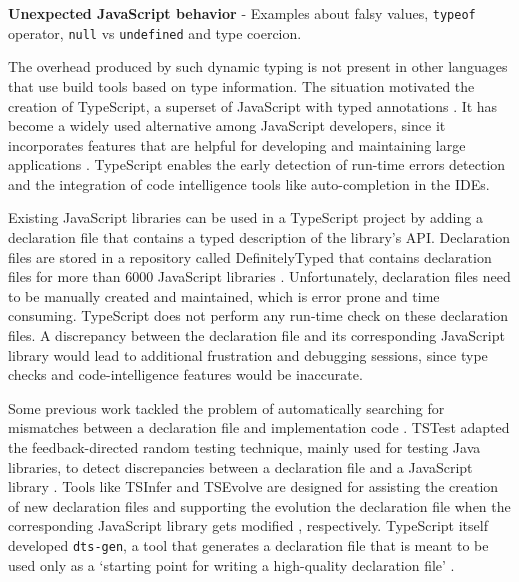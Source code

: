 \begin{code}
	\captionsetup{aboveskip=0pt, belowskip=10pt}
	\caption[Unexpected JavaScript behavior]{\textbf{Unexpected JavaScript behavior} - Examples about falsy values, \texttt{typeof} operator, \texttt{null} vs \texttt{undefined} and type coercion.}
	\label{code:introduction-javascript-wtfs}
  \end{code}

The overhead produced by such dynamic typing is not present in other languages that use build tools based on type information. The situation motivated the creation of TypeScript, a superset of JavaScript with typed annotations \citep{typescript}. It has become a widely used alternative among JavaScript developers, since it incorporates features that are helpful for developing and maintaining large applications \citep{DBLP:conf/icse/GaoBB17}. TypeScript enables the early detection of run-time errors detection and the integration of code intelligence tools like auto-completion in the IDEs.

Existing JavaScript libraries can be used in a TypeScript project by adding a declaration file that contains a typed description of the library's API. Declaration files are stored in a repository called DefinitelyTyped that contains declaration files for more than 6000 JavaScript libraries \citep{definitely-typed-repository}. Unfortunately, declaration files need to be manually created and maintained, which is error prone and time consuming. TypeScript does not perform any run-time check on these declaration files. A discrepancy between the declaration file and its corresponding JavaScript library would lead to additional frustration and debugging sessions, since type checks and code-intelligence features would be inaccurate.

Some previous work tackled the problem of automatically searching for mismatches between a declaration file and implementation code \citep{DBLP:conf/oopsla/FeldthausM14}. TSTest adapted the feedback-directed random testing technique, mainly used for testing Java libraries, to detect discrepancies between a declaration file and a JavaScript library \citep{DBLP:journals/pacmpl/KristensenM17}. Tools like TSInfer and TSEvolve are designed for assisting the creation of new declaration files and supporting the evolution the declaration file when the corresponding JavaScript library gets modified \citep{DBLP:conf/fase/KristensenM17}, respectively. TypeScript itself developed \texttt{dts-gen}, a tool that generates a declaration file that is meant to be used only as a `starting point for writing a high-quality declaration file' \citep{dts-gen}.

